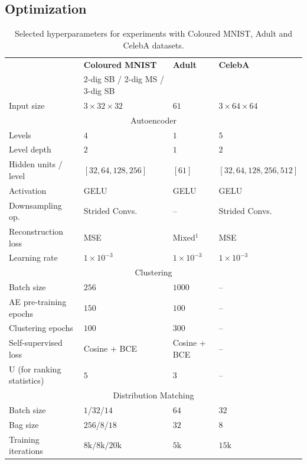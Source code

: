 \subsection{Optimization}
\begin{table}[p]
 \centering
 \caption{Selected hyperparameters for experiments with Coloured MNIST, Adult and CelebA datasets.}
 \label{tab:hparams}
 \begin{tabular}{llll}
 \toprule
 & \textbf{Coloured MNIST} & \textbf{Adult} & \textbf{CelebA}       
 \\ & 2-dig SB / 2-dig MS / 3-dig SB
 \\ \midrule
 Input size  &   $3 \times 32 \times 32$ & $61$ & $3 \times 64 \times 64$ \\  \midrule
 \multicolumn{4}{c}{Autoencoder}                     \\ \midrule
 Levels                      & $4$         & $1$    & $5$\\
 Level depth                 & $2$         & $1$    & $2$\\
 Hidden units / level        & $[32, 64, 128, 256]$ & $[61]$ & $[32, 64, 128, 256, 512]$\\
 Activation                  & GELU        & GELU   & GELU   \\
 Downsampling op.  & Strided Convs. & -- & Strided Convs.\\
 Reconstruction loss         & MSE         & Mixed$^1$  & MSE \\
 Learning rate               & $1 \times 10^{-3}$   & $1 \times 10^{-3}$  & $1 \times 10^{-3}$ \\ \midrule
 \multicolumn{4}{c}{Clustering}                      \\ \midrule
 Batch size                  & $256$      & $1000$  & --\\
 AE pre-training epochs      & $150$        & $100$ & --   \\
 Clustering epochs           & $100$       & $300$  & -- \\
 Self-supervised loss & Cosine + BCE & Cosine + BCE & --\\
 U (for ranking statistics)             & $5$         & $3$     & --    \\   \midrule
 \multicolumn{4}{c}{Distribution Matching}                   \\ \midrule
 Batch size & $1$/$32$/$14$  & $64$   & $32$ \\
 Bag size   & $256$/$8$/$18$ & $32$ & $8$ \\
 Training iterations    & $8\text{k}/8\text{k}/20\text{k}$ & $5\text{k}$ & $15\text{k}$ \\

\end{tabular}
\end{table}
